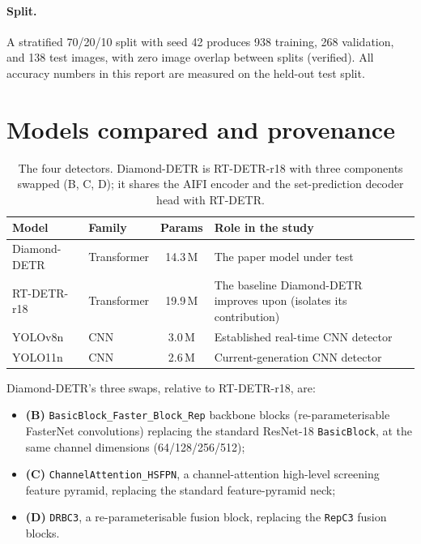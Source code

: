 \documentclass[11pt,a4paper]{article}
\begin{document}
\paragraph{Split.}
A stratified 70/20/10 split with seed 42 produces 938 training, 268 validation, and 138 test
images, with zero image overlap between splits (verified). All accuracy numbers in this report are
measured on the held-out test split.

\section{Models compared and provenance}
\begin{table}[H]
\centering
\caption{The four detectors. Diamond-DETR is RT-DETR-r18 with three components swapped (B, C, D);
it shares the AIFI encoder and the set-prediction decoder head with RT-DETR.}
\label{tab:models}
\small
\renewcommand{\arraystretch}{1.2}
\begin{tabularx}{\textwidth}{l l c X}
\toprule
\textbf{Model} & \textbf{Family} & \textbf{Params} & \textbf{Role in the study} \\
\midrule
Diamond-DETR & Transformer & 14.3\,M & The paper model under test \\
RT-DETR-r18  & Transformer & 19.9\,M & The baseline Diamond-DETR improves upon (isolates its contribution) \\
YOLOv8n      & CNN         & 3.0\,M  & Established real-time CNN detector \\
YOLO11n      & CNN         & 2.6\,M  & Current-generation CNN detector \\
\bottomrule
\end{tabularx}
\end{table}

Diamond-DETR's three swaps, relative to RT-DETR-r18, are:
\begin{itemize}[leftmargin=1.4em,itemsep=2pt,topsep=2pt]
  \item \textbf{(B)} \texttt{BasicBlock\_Faster\_Block\_Rep} backbone blocks (re-parameterisable
        FasterNet convolutions) replacing the standard ResNet-18 \texttt{BasicBlock}, at the same
        channel dimensions (64/128/256/512);
  \item \textbf{(C)} \texttt{ChannelAttention\_HSFPN}, a channel-attention high-level screening
        feature pyramid, replacing the standard feature-pyramid neck;
  \item \textbf{(D)} \texttt{DRBC3}, a re-parameterisable fusion block, replacing the
        \texttt{RepC3} fusion blocks.
\end{itemize}
\end{document}
